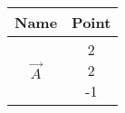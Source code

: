 \begin{tabular}[12pt]{ |c| c|}
    \hline
    \textbf{Name} & \textbf{Point}\\ 
    \hline
	$\vec{A}$ & \myvec{2\\2\\-1} \\
    \hline
    \end{tabular}
